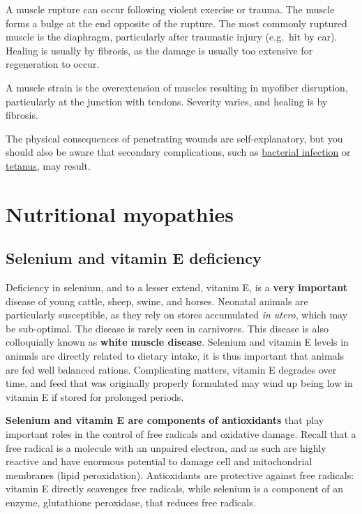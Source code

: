 \documentclass[openany]{report}
\begin{document}
A muscle rupture can occur following violent exercise or trauma. The
muscle forms a bulge at the end opposite of the rupture. The most
commonly ruptured muscle is the diaphragm, particularly after traumatic
injury (e.g.~hit by car). Healing is usually by fibrosis, as the damage
is usually too extensive for regeneration to occur.

A muscle strain is the overextension of muscles resulting in myofiber
disruption, particularly at the junction with tendons. Severity varies,
and healing is by fibrosis.

The physical consequences of penetrating wounds are self-explanatory,
but you should also be aware that secondary complications, such as
\protect\hyperlink{suppurative-myositis}{bacterial infection} or
\protect\hyperlink{tetanus}{tetanus}, may result.

\chapter{Nutritional myopathies}\label{nutritional-myopathies}

\hypertarget{selenium-and-vitamin-e-deficiency}{\section{Selenium and
vitamin E deficiency}\label{selenium-and-vitamin-e-deficiency}}

Deficiency in selenium, and to a lesser extend, vitanim E, is a
\textbf{very important} disease of young cattle, sheep, swine, and
horses. Neonatal animals are particularly susceptible, as they rely on
stores accumulated \emph{in utero}, which may be sub-optimal. The
disease is rarely seen in carnivores. This disease is also colloquially
known as \textbf{white muscle disease}. Selenium and vitamin E levels in
animals are directly related to dietary intake, it is thus important
that animals are fed well balanced rations. Complicating matters,
vitamin E degrades over time, and feed that was originally properly
formulated may wind up being low in vitamin E if stored for prolonged
periods.

\textbf{Selenium and vitamin E are components of antioxidants} that play
important roles in the control of free radicals and oxidative damage.
Recall that a free radical is a molecule with an unpaired electron, and
as such are highly reactive and have enormous potential to damage cell
and mitochondrial membranes (lipid peroxidation). Antioxidants are
protective against free radicals: vitamin E directly scavenges free
radicals, while selenium is a component of an enzyme, glutathione
peroxidase, that reduces free radicals.
\end{document}
